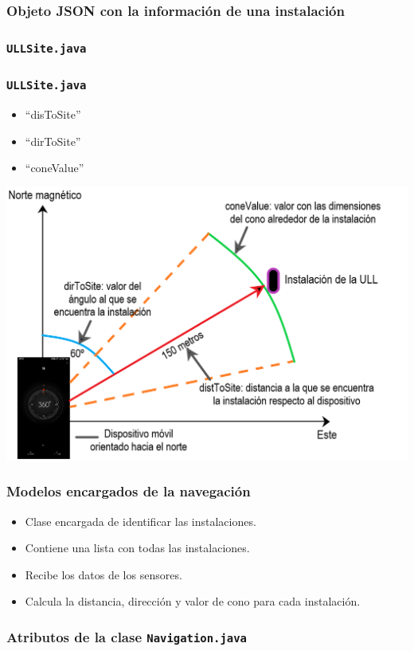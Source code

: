 \begin{frame}
	\frametitle{Objeto JSON con la información de una instalación}
	
\end{frame}

\begin{frame}
	\frametitle{\texttt{ULLSite.java}}
	
\end{frame}


\begin{frame}
	\frametitle{\texttt{ULLSite.java}}
			\begin{itemize}
				\item  ``disToSite''
				\item ``dirToSite''
				\item ``coneValue''
			\end{itemize}
			\endblock{}
			\begin{center} 
				\includegraphics[width=0.65\linewidth]{Images/imagenAR}
			\end{center}
\end{frame}
 
\begin{frame}
	\frametitle{Modelos encargados de la navegación}
			\begin{itemize}
				\item Clase encargada de identificar las instalaciones.
				\item Contiene una lista con todas las instalaciones.
				\item Recibe los datos de los sensores.
				\item Calcula la distancia, dirección y valor de cono para cada instalación.
			\end{itemize}
			\endblock{}
\end{frame}
 
 
\begin{frame}
	\frametitle{Atributos de la clase \texttt{Navigation.java}}
	
\end{frame}

